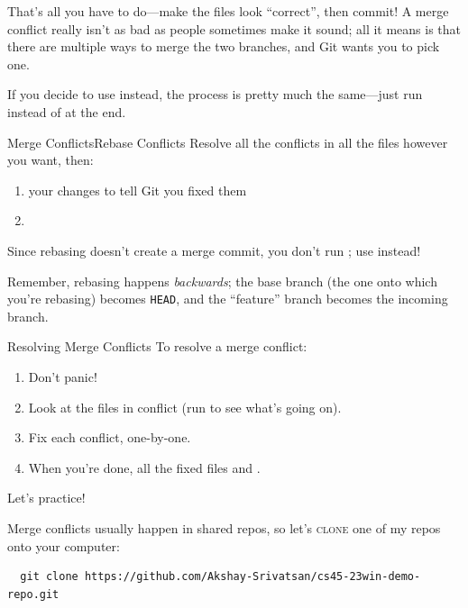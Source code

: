 That's all you have to do---make the files look \enquote{correct}, then commit!
A merge conflict really isn't as bad as people sometimes make it sound; all it
means is that there are multiple ways to merge the two branches, and Git wants
you to pick one.

If you decide to use  instead, the process is pretty much the
same---just run  instead of  at the
end.

\begin{frame}[fragile]{Merge Conflicts}{Rebase Conflicts}
  Resolve all the conflicts in all the files however you want, then:
  \begin{enumerate}
    \item {} your changes to tell Git you fixed them
    \item {}
  \end{enumerate}

  Since rebasing doesn't create a merge commit, you don't run ;
  use  instead!

  Remember, rebasing happens \textit{backwards}; the base branch (the one onto
  which you're rebasing) becomes \texttt{HEAD}, and the \enquote{feature}
  branch becomes the incoming branch.
\end{frame}

\begin{frame}[fragile]{Resolving Merge Conflicts}
  To resolve a merge conflict:
  \begin{enumerate}
    \item Don't panic!
    \item Look at the files in conflict (run  to see what's
      going on).
    \item Fix each conflict, one-by-one.
    \item When you're done,  all the fixed files and .
  \end{enumerate}

  \pause
  Let's practice!

  Merge conflicts usually happen in shared repos, so let's \textsc{clone} one
  of my repos onto your computer:

  \begin{verbatim}
  git clone https://github.com/Akshay-Srivatsan/cs45-23win-demo-repo.git
  \end{verbatim}
\end{frame}

